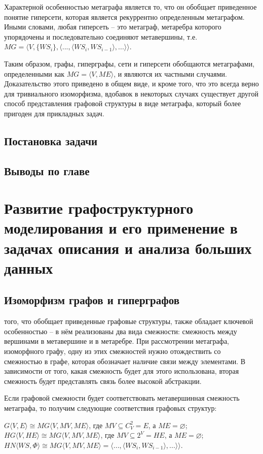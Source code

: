 Характерной особенностью метаграфа является то, что он обобщает приведенное понятие гиперсети, которая является рекуррентно определенным метаграфом. Иными словами, любая гиперсеть -- это метаграф, метаребра которого упорядочены и последовательно соединяют метавершины, т.е. $MG=\Big\langle V, \{WS_i\}, \big\langle ..., \langle WS_i , WS_{i-1}\rangle, ... \big\rangle \Big\rangle$.

Таким образом, графы, гиперграфы, сети и гиперсети обобщаются метаграфами, определенными как $MG=\langle V, ME \rangle$, и являются их частными случаями. Доказательство этого приведено в общем виде, и кроме того, что это всегда верно для тривиального изоморфизма, вдобавок в некоторых случаях существует другой способ представления графовой структуры в виде метаграфа, который более пригоден для прикладных задач.

\subsection{Постановка задачи}
\subsection{Выводы по главе}

\newpage
\section{Развитие графоструктурного моделирования и его применение в задачах описания и анализа больших данных}
\subsection{Изоморфизм графов и гиперграфов}
 того, что обобщает приведенные графовые структуры, также обладает ключевой особенностью -- в нём реализованы два вида смежности: смежность между вершинами в метавершине и в метаребре. При рассмотрении метаграфа, изоморфного графу, одну из этих смежностей нужно отождествить со смежностью в графе, которая обозначает наличие связи между элементами. В зависимости от того, какая смежность будет для этого использована, вторая смежность будет представлять связь более высокой абстракции.

Если графовой смежности будет соответствовать метавершинная смежность метаграфа, то получим следующие соответствия графовых структур:\\
\vspace{-0.6cm}
\begin{center}
	$G\langle V, E \rangle \cong MG \langle V, MV, ME \rangle$, где $MV \subseteq C_V^2 = E$, а $ME=\varnothing$;
	$HG\langle V, HE \rangle \cong MG \langle V, MV, ME \rangle$, где $MV \subseteq 2^V = HE$, а $ME=\varnothing$;
	$HN\langle WS, \Phi \rangle \cong MG \langle V, MV, ME \rangle=\big\langle ..., \langle WS_i , WS_{i-1}\rangle, ... \big\rangle \Big\rangle$.
\end{center}

